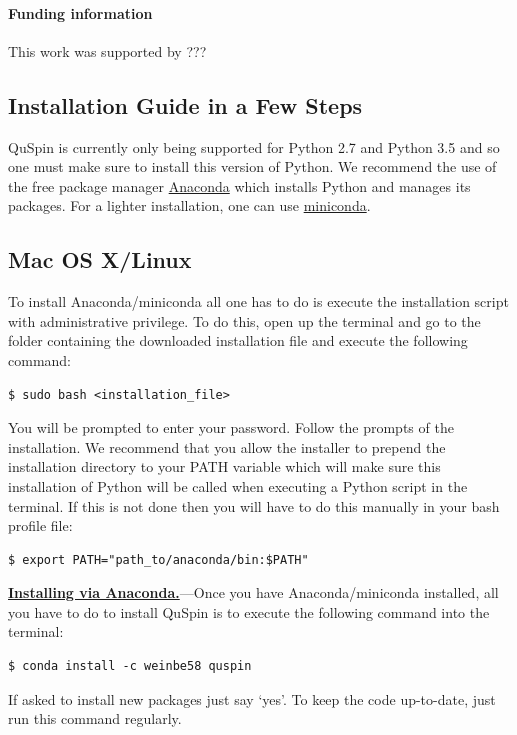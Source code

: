 \documentclass{SciPost}
\newcommand\0{\scalebox{-1}[1]{0}}
\let\svttfamily\ttfamily
\renewcommand\ttfamily{\svttfamily\catcode`0=\active }
\begin{document}
\paragraph{Funding information}
This work was supported by ???
\begin{appendix}
	
	\section{Installation Guide in a Few Steps}
	\label{app:install}
	
	QuSpin is currently only being supported for Python 2.7 and Python 3.5 and so one must make sure to install this version of Python. We recommend the use of the free package manager \href{https://www.continuum.io/downloads}{Anaconda} which installs Python and manages its packages. For a lighter installation, one can use \href{http://conda.pydata.org/miniconda.html}{miniconda}.
	
	\subsection{Mac OS X/Linux}
	To install Anaconda/miniconda all one has to do is execute the installation script with administrative privilege. To do this, open up the terminal and go to the folder containing the downloaded installation file and execute the following command: 
	\begin{lstlisting}[numbers=none,keywordstyle=\ttfamily]
	$ sudo bash <installation_file>
	\end{lstlisting}
	You will be prompted to enter your password. Follow the prompts of the installation. We recommend that you allow the installer to prepend the installation directory to your PATH variable which will make sure this installation of Python will be called when executing a Python script in the terminal. If this is not done then you will have to do this manually in your bash profile file:
	\begin{lstlisting}[numbers=none,keywordstyle=\ttfamily]
	$ export PATH="path_to/anaconda/bin:$PATH"
	\end{lstlisting}
	
	\underline{\bf Installing via Anaconda.}---Once you have Anaconda/miniconda installed, all you have to do to install QuSpin is to execute the following command into the terminal: 
	\begin{lstlisting}[numbers=none,keywordstyle=\ttfamily]
	$ conda install -c weinbe58 quspin
	\end{lstlisting}
	If asked to install new packages just say `yes'. To keep the code up-to-date, just run this command regularly. 
	

\end{appendix}
\end{document}
